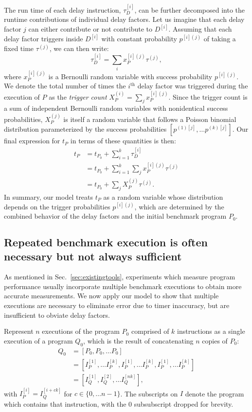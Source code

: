 \documentclass[conference]{IEEEtran}
\begin{document}
The run time of each delay instruction, $\tau^{[i]}_D$, can be further decomposed
into the runtime contributions of individual delay factors. Let us imagine that
each delay factor $j$ can either contribute or not contribute to $D^{[i]}$.
Assuming that each delay factor triggers inside $D^{[i]}$ with constant
probability $p^{[i](j)}$ of taking a fixed time $\tau^{(j)}$, we can then
write:
%
\begin{equation}
    \tau^{[i]}_D = \sum_{i} x_P^{[i](j)} \tau^{(j)},
\end{equation}
%
where $x_P^{[i](j)}$ is a Bernoulli random variable with success probability $p^{[i](j)}$.
We denote the total number of times the $i^{\textrm{th}}$ delay factor was triggered during
the execution of $P$ as the \textit{trigger count} $X_P^{(i)} = \sum_{j} x_P^{[i](j)}$.
Since the trigger count is a sum of independent Bernoulli random variables with nonidentical
success probabilities, $X_P^{(j)}$ is itself a random variable that follows a Poisson
binomial distribution parameterized by the success probabilities $\left[p^{(1)[j]}, \dots
p^{(k)[j]}\right]$. Our final expression for $t_P$ in terms of these quantities is then:
%
\begin{align}
t_P &= t_{P_0} + \sum_{i=1}^{k} \tau^{[i]}_D \nonumber \\
    &= t_{P_0} + \sum_{i=1}^{k} \sum_{j} x_P^{[i](j)} \tau^{(j)} \nonumber \\
    &= t_{P_0} + \sum_{j} X_P^{(j)} \tau^{(j)}.
\end{align}
%
In summary, our model treats $t_P$ as a random variable whose distribution
depends on the trigger probabilities $p^{[i](j)}$, which are determined by the
combined behavior of the delay factors and the initial benchmark program $P_0$.

\subsection{Repeated benchmark execution is often necessary but not always sufficient}
\label{sec:measuremodel}

As mentioned in Sec.~\ref{sec:existingtools}, experiments which measure program
performance usually incorporate multiple benchmark executions to obtain more
accurate measurements. We now apply our model to show that multiple executions
are necessary to eliminate error due to timer inaccuracy, but are insufficient
to obviate delay factors.

Represent $n$ executions of the program $P_0$ comprised of $k$ instructions as
a single execution of a program $Q_0$, which is the result of concatenating $n$
copies of $P_0$:
%
\begin{align}
Q_0 &= \left[P_0, P_0, \dots P_0 \right] \nonumber \\
    &= \left[I_{P}^{[1]}, \dots I_{P}^{[k]}, I_{P}^{[1]}, \dots I_{P}^{[k]}, I_{P}^{[1]}, \dots I_{P}^{[k]} \right] \nonumber \\
    &= \left[I_{Q}^{[1]}, I_{Q}^{[2]}, \dots I_{Q}^{[nk]} \right],
\end{align}
%
with $I_{P}^{[i]} = I_{Q}^{[i + ck]}$ for $c \in \{0, \dots n - 1\}$. The
subscripts on $I$ denote the program which contains that instruction, with the
0 subsubscript dropped for brevity.
\end{document}
